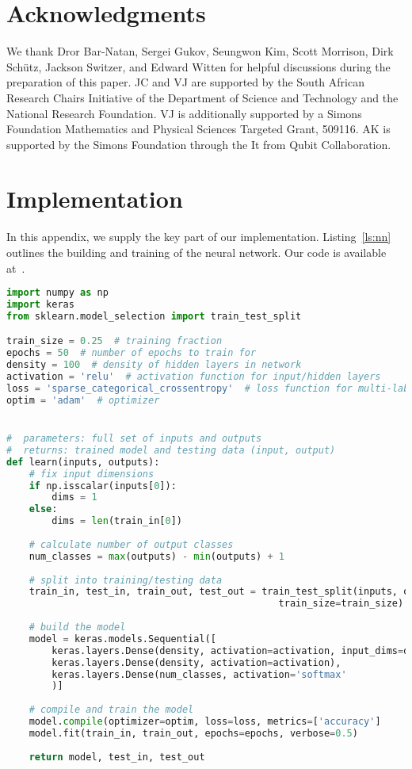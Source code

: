 \documentclass[11pt]{article}
\numberwithin{equation}{section}
\begin{document}
\section*{Acknowledgments}
We thank Dror Bar-Natan, Sergei Gukov, Seungwon Kim, Scott Morrison, Dirk Sch\"utz, Jackson Switzer, and Edward Witten for helpful discussions during the preparation of this paper.
JC and VJ are supported by the South African Research Chairs Initiative of the Department of Science and Technology and the National Research Foundation.
VJ is additionally supported by a Simons Foundation Mathematics and Physical Sciences Targeted Grant, 509116.
AK is supported by the Simons Foundation through the It from Qubit Collaboration.

\appendix

\section{Implementation}\label{app:code}
In this appendix, we supply the key part of our implementation.
Listing~\ref{ls:nn} outlines the building and training of the neural network.
Our code is available at~\cite{github}.

\begin{lstlisting}[language=Python, caption=Keras implementation, label=ls:nn]
import numpy as np
import keras
from sklearn.model_selection import train_test_split

train_size = 0.25  # training fraction
epochs = 50  # number of epochs to train for
density = 100  # density of hidden layers in network
activation = 'relu'  # activation function for input/hidden layers
loss = 'sparse_categorical_crossentropy'  # loss function for multi-label classification
optim = 'adam'  # optimizer


#  parameters: full set of inputs and outputs
#  returns: trained model and testing data (input, output)
def learn(inputs, outputs):
    # fix input dimensions
    if np.isscalar(inputs[0]):
        dims = 1
    else:
        dims = len(train_in[0])
        
    # calculate number of output classes
    num_classes = max(outputs) - min(outputs) + 1
    
    # split into training/testing data
    train_in, test_in, train_out, test_out = train_test_split(inputs, outputs,
                                                train_size=train_size)
    
    # build the model
    model = keras.models.Sequential([
        keras.layers.Dense(density, activation=activation, input_dims=dims),
        keras.layers.Dense(density, activation=activation),
        keras.layers.Dense(num_classes, activation='softmax'
        )]
        
    # compile and train the model
    model.compile(optimizer=optim, loss=loss, metrics=['accuracy']
    model.fit(train_in, train_out, epochs=epochs, verbose=0.5)
    
    return model, test_in, test_out
\end{lstlisting}



\end{document}
